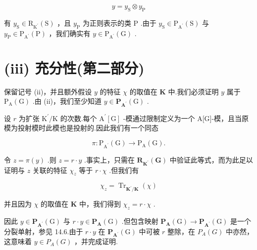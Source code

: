 \documentclass[10pt]{article}
\begin{document}
\[
y = {y}_{\mathrm{S}} \otimes  {y}_{\mathrm{P}}
\]

有 \({y}_{\mathrm{S}} \in  {\mathrm{R}}_{{\mathrm{K}}^{\prime }}\left( \mathrm{S}\right)\) ，且 \({y}_{\mathrm{P}}\) 为正则表示的类 \(\mathrm{P}\) .由于 \({y}_{\mathrm{S}} \in  {\mathrm{P}}_{{\mathrm{A}}^{\prime }}\left( \mathrm{S}\right)\) 与 \({y}_{\mathrm{P}} \in  {\mathrm{P}}_{{\mathrm{A}}^{\prime }}\left( \mathrm{P}\right)\) ，我们确实有 \(y \in  {\mathrm{P}}_{{\mathrm{A}}^{\prime }}\left( \mathrm{G}\right)\) .

\section*{(iii) 充分性(第二部分)}

保留记号 (ii)，并且额外假设 \(y\) 的特征 \(\chi\) 的取值在 \(\mathbf{K}\) 中.我们必须证明 \(y\) 属于 \({\mathrm{P}}_{\mathrm{A}}\left( \mathrm{G}\right)\) .由 (ii)，我们至少知道 \(y \in  {\mathbf{P}}_{{\mathbf{A}}^{\prime }}\left( \mathrm{G}\right)\) .

设 \(r\) 为扩张 \({\mathrm{K}}^{\prime }/\mathrm{K}\) 的次数.每个 \({\mathrm{A}}^{\prime }\left\lbrack  \mathrm{G}\right\rbrack\) -模通过限制定义为一个 A[G]-模，且当原模为投射模时此模也是投射的.因此我们有一个同态

\[
\pi  : {\mathrm{P}}_{{\mathrm{A}}^{\prime }}\left( \mathrm{G}\right)  \rightarrow  {\mathrm{P}}_{\mathrm{A}}\left( \mathrm{G}\right) .
\]

令 \(z = \pi \left( y\right)\) .则 \(z = r \cdot  y\) .事实上，只需在 \({\mathbf{R}}_{{\mathbf{K}}^{\prime }}\left( \mathbf{G}\right)\) 中验证此等式，而为此足以证明与 \(z\) 关联的特征 \({\chi }_{z}\) 等于 \(r \cdot  \chi\) .但我们有

\[
{\chi }_{z} = {\operatorname{Tr}}_{{\mathbf{K}}^{\prime }/\mathbf{K}}\left( \chi \right)
\]

并且因为 \(\chi\) 的取值在 \(\mathbf{K}\) 中，我们得到 \({\chi }_{z} = r \cdot  \chi\) .

因此 \(y \in  {\mathbf{P}}_{{\mathbf{A}}^{\prime }}\left( \mathrm{G}\right)\) 与 \(r \cdot  y \in  {\mathbf{P}}_{\mathbf{A}}\left( \mathrm{G}\right)\) .但包含映射 \({\mathbf{P}}_{\mathbf{A}}\left( \mathrm{G}\right)  \rightarrow  {\mathbf{P}}_{{\mathbf{A}}^{\prime }}\left( \mathrm{G}\right)\) 是一个分裂单射，参见 14.6.由于 \(r \cdot  y\) 在 \({\mathbf{P}}_{{\mathbf{A}}^{\prime }}\left( \mathrm{G}\right)\) 中可被 \(r\) 整除，在 \({P}_{A}\left( G\right)\) 中亦然，这意味着 \(y \in  {P}_{A}\left( G\right)\) ，并完成证明.
\end{document}
